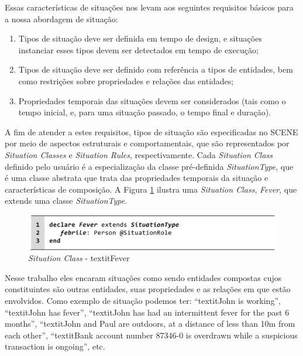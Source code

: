 \documentclass[12pt,a4paper,compsoc]{IEEEtran}
\begin{document}
  Essas características de situações nos levam aos seguintes requisitos básicos para a nossa
  abordagem de situação:
  \begin{enumerate}
    \item Tipos de situação deve ser definida em tempo de design, e situações instanciar esses
    tipos devem ser detectados em tempo de execução;
    \item Tipos de situação deve ser definido com referência a tipos de entidades, bem como 
    restrições sobre propriedades e relações das entidades;
    \item Propriedades temporais das situações devem ser considerados (tais como o tempo inicial,
    e, para uma situação passado, o tempo final e duração).  
  \end{enumerate}
  
  A fim de atender a estes requisitos, tipos de situação são especificadas no SCENE por meio de 
  aspectos estruturais e comportamentais, que são representados por  \textit{Situation Classes} e
  \textit{Situation Rules}, respectivamente. Cada \textit{Situation Class} definido pelo usuário é
  a especialização da classe pré-definida \textit{SituationType}, que é uma classe abstrata que
  trata das propriedades temporais da situação e características de composição. A Figura
  \ref{situation-classe-fever} ilustra uma \textit{Situation Class}, \textit{Fever}, que extends
  uma classe \textit{SituationType}.
  
  \begin{figure}[t!]
    \centerline{\includegraphics[scale=.2]{imagens/situation-classe-fever}}
    \caption{\textit{Situation Class} - textit{Fever} \cite{pereira2013rule}}
    \label{situation-classe-fever}
  \end{figure}

  Nesse trabalho eles encaram situações como sendo entidades compostas cujos constituintes são
  outras entidades, suas propriedades e as relações em que estão envolvidos. Como exemplo de
  situação podemos ter: ``textit{John is working}'', ``textit{John has fever}'', 
  ``textit{John has had an intermittent fever for the past 6 months}'', 
  ``textit{John and Paul are outdoors, at a distance of less than 10m from each other}'',
  ``textit{Bank account number 87346-0 is overdrawn while a suspicious transaction is ongoing}'',
  etc.
\end{document}
